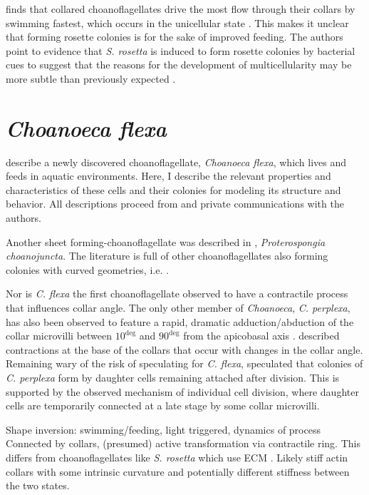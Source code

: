 \citet{kirkegaard2016} finds that collared choanoflagellates drive the most flow through their collars by swimming fastest, which occurs in the unicellular state \citep{michelin2011}. This makes it unclear that forming rosette colonies is for the sake of improved feeding. The authors point to evidence that \textit{S. rosetta} is induced to form rosette colonies by bacterial cues to suggest that the reasons for the development of multicellularity may be more subtle than previously expected \citep{alegado2012}.

\section{\textit{Choanoeca flexa}}  %

\citet{brunet2019} describe a newly discovered choanoflagellate, \textit{Choanoeca flexa}, which lives and feeds in aquatic environments. Here, I describe the relevant properties and characteristics of these cells and their colonies for modeling its structure and behavior. All descriptions proceed from \citet{brunet2019} and private communications with the authors.

Another sheet forming-choanoflagellate was described in \citet{leadbeater1983}, \textit{Proterospongia choanojuncta}. The literature is full of other choanoflagellates also forming colonies with curved geometries, i.e. \citet{lauterborn1898}. 

Nor is \textit{C. flexa} the first choanoflagellate observed to have a contractile process that influences collar angle. The only other member of \textit{Choanoeca}, \textit{C. perplexa}, has also been observed to feature a rapid, dramatic adduction/abduction of the collar microvilli between $10^\deg$ and $90^\deg$ from the apicobasal axis \citep{ellis1930}. \citet{leadbeater1977} described contractions at the base of the collars that occur with changes in the collar angle.
Remaining wary of the risk of speculating for \textit{C. flexa}, \citet{leadbeater1977} speculated that colonies of \textit{C. perplexa} form by daughter cells remaining attached after division. This is supported by the observed mechanism of individual cell division, where daughter cells are temporarily connected at a late stage by some collar microvilli. 

Shape inversion: swimming/feeding, light triggered, dynamics of process
Connected by collars, (presumed) active transformation via contractile ring. This differs from choanoflagellates like \textit{S. rosetta} which use ECM \citep{larson2020}. 
Likely stiff actin collars with some intrinsic curvature and potentially different stiffness between the two states.

